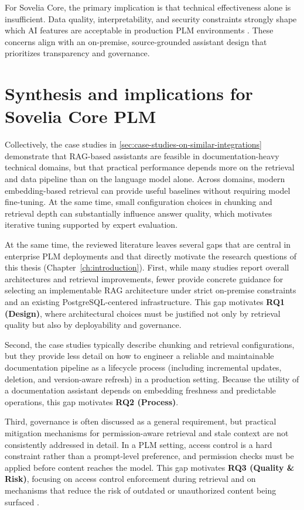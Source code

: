 For Sovelia Core, the primary implication is that technical effectiveness alone is insufficient. Data quality, interpretability, and security constraints strongly shape which AI features are acceptable in production PLM environments \parencite{wangArtificialIntelligenceProduct2021}. These concerns align with an on-premise, source-grounded assistant design that prioritizes transparency and governance.

\section{Synthesis and implications for Sovelia Core PLM}

Collectively, the case studies in \autoref{sec:case-studies-on-similar-integrations} demonstrate that RAG-based assistants are feasible in documentation-heavy technical domains, but that practical performance depends more on the retrieval and data pipeline than on the language model alone. Across domains, modern embedding-based retrieval can provide useful baselines without requiring model fine-tuning. At the same time, small configuration choices in chunking and retrieval depth can substantially influence answer quality, which motivates iterative tuning supported by expert evaluation.

At the same time, the reviewed literature leaves several gaps that are central in enterprise PLM deployments and that directly motivate the research questions of this thesis (Chapter~\ref{ch:introduction}). First, while many studies report overall architectures and retrieval improvements, fewer provide concrete guidance for selecting an implementable RAG architecture under strict on-premise constraints and an existing PostgreSQL-centered infrastructure. This gap motivates \textbf{RQ1 (Design)}, where architectural choices must be justified not only by retrieval quality but also by deployability and governance.

Second, the case studies typically describe chunking and retrieval configurations, but they provide less detail on how to engineer a reliable and maintainable documentation pipeline as a lifecycle process (including incremental updates, deletion, and version-aware refresh) in a production setting. Because the utility of a documentation assistant depends on embedding freshness and predictable operations, this gap motivates \textbf{RQ2 (Process)}.

Third, governance is often discussed as a general requirement, but practical mitigation mechanisms for permission-aware retrieval and stale context are not consistently addressed in detail. In a PLM setting, access control is a hard constraint rather than a prompt-level preference, and permission checks must be applied before content reaches the model. This gap motivates \textbf{RQ3 (Quality \& Risk)}, focusing on access control enforcement during retrieval and on mechanisms that reduce the risk of outdated or unauthorized content being surfaced \parencite{jeongPermissionAwareRAGIdentity2025, zhongHoneyBeeEfficientRolebased2025}.

